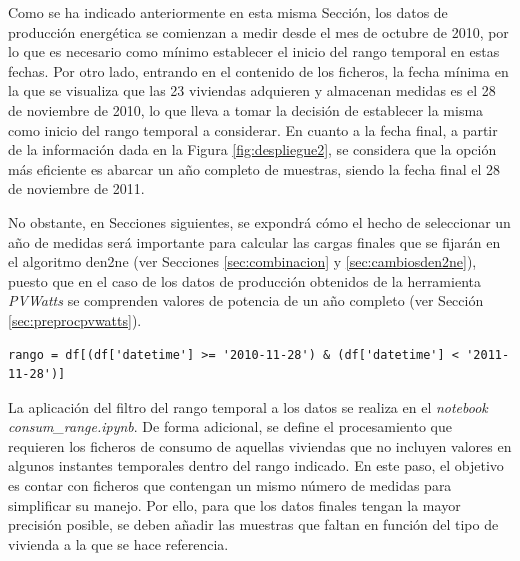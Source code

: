 \vspace{3mm}

Como se ha indicado anteriormente en esta misma Sección, los datos de producción energética se comienzan a medir desde el mes de octubre de 2010, por lo que es necesario como mínimo establecer el inicio del rango temporal en estas fechas. Por otro lado, entrando en el contenido de los ficheros, la fecha mínima en la que se visualiza que las 23 viviendas adquieren y almacenan medidas es el 28 de noviembre de 2010, lo que lleva a tomar la decisión de establecer la misma como inicio del rango temporal a considerar. En cuanto a la fecha final, a partir de la información dada en la Figura \ref{fig:despliegue2}, se considera que la opción más eficiente es abarcar un año completo de muestras, siendo la fecha final el 28 de noviembre de 2011. 

\vspace{3mm}

No obstante, en Secciones siguientes, se expondrá cómo el hecho de seleccionar un año de medidas será importante para calcular las cargas finales que se fijarán en el algoritmo \gls{den2ne} (ver Secciones \ref{sec:combinacion} y \ref{sec:cambiosden2ne}), puesto que en el caso de los datos de producción obtenidos de la herramienta \textit{PVWatts} se comprenden valores de potencia de un año completo (ver Sección \ref{sec:preprocpvwatts}).

\vspace{3mm}

\begin{lstlisting}[style=Python, caption={Aplicación del rango temporal a los ficheros}]
rango = df[(df['datetime'] >= '2010-11-28') & (df['datetime'] < '2011-11-28')] 
\end{lstlisting}

\vspace{3mm}

\pagebreak

La aplicación del filtro del rango temporal a los datos se realiza en el \textit{notebook} \textit{consum\_range.ipynb}. De forma adicional, se define el procesamiento que requieren los ficheros de consumo de aquellas viviendas que no incluyen valores en algunos instantes temporales dentro del rango indicado. En este paso, el objetivo es contar con ficheros que contengan un mismo número de medidas para simplificar su manejo. Por ello, para que los datos finales tengan la mayor precisión posible, se deben añadir las muestras que faltan en función del tipo de vivienda a la que se hace referencia. 

